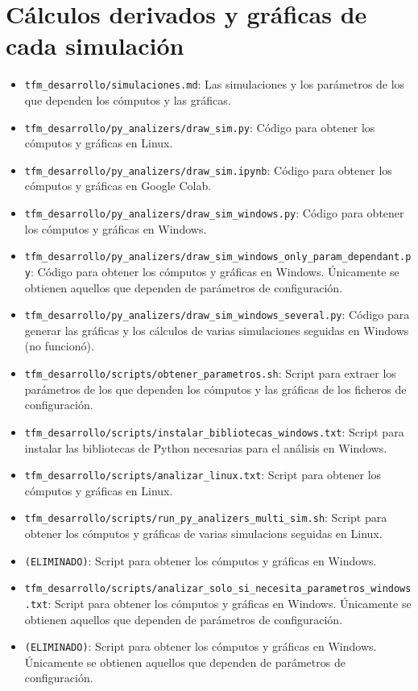 \documentclass[12pt]{report} %
\begin{document}
\section* {Cálculos derivados y gráficas de cada simulación}

\begin{itemize}
\item \verb|tfm_desarrollo/simulaciones.md|: Las simulaciones y los parámetros de los que dependen los cómputos y las gráficas.
\item \verb|tfm_desarrollo/py_analizers/draw_sim.py|: Código para obtener los cómputos y gráficas en Linux.
\item \verb|tfm_desarrollo/py_analizers/draw_sim.ipynb|: Código para obtener los cómputos y gráficas en Google Colab.
\item \verb|tfm_desarrollo/py_analizers/draw_sim_windows.py|: Código para obtener los cómputos y gráficas en Windows.
\item \verb|tfm_desarrollo/py_analizers/draw_sim_windows_only_param_dependant.py|: Código para obtener los cómputos y gráficas en Windows. Únicamente se obtienen aquellos que dependen de parámetros de configuración.
\item \verb|tfm_desarrollo/py_analizers/draw_sim_windows_several.py|: Código para generar las gráficas y los cálculos de varias simulaciones seguidas en Windows (no funcionó).
\item \verb|tfm_desarrollo/scripts/obtener_parametros.sh|: Script para extraer los parámetros de los que dependen los cómputos y las gráficas de los ficheros de configuración.
\item \verb|tfm_desarrollo/scripts/instalar_bibliotecas_windows.txt|: Script para instalar las bibliotecas de Python necesarias para el análisis en Windows.
\item \verb|tfm_desarrollo/scripts/analizar_linux.txt|: Script para obtener los cómputos y gráficas en Linux.
\item \verb|tfm_desarrollo/scripts/run_py_analizers_multi_sim.sh|: Script para obtener los cómputos y gráficas de varias simulacions seguidas en Linux.
\item \verb|(ELIMINADO)|: Script para obtener los cómputos y gráficas en Windows.
\item \verb|tfm_desarrollo/scripts/analizar_solo_si_necesita_parametros_windows.txt|: Script para obtener los cómputos y gráficas en Windows. Únicamente se obtienen aquellos que dependen de parámetros de configuración.
\item \verb|(ELIMINADO)|: Script para obtener los cómputos y gráficas en Windows. Únicamente se obtienen aquellos que dependen de parámetros de configuración.

\end{itemize}
\end{document}
